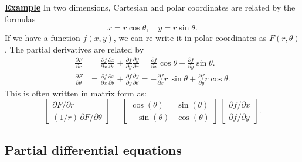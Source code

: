 \documentclass[10pt,a4paper]{article}
\begin{document}
\begin{framed}
\noindent
\underline{\textbf{Example}}
\vskip 0.1in \noindent
In two dimensions, Cartesian and polar coordinates are related by the
formulas
\begin{equation}
x = r\cos\theta, \quad y = r\sin\theta.
\end{equation}
If we have a function $f(x,y)$, we can re-write it in polar
coordinates as $F(r,\theta)$.  The partial derivatives are related by
\begin{align}
  \frac{\partial F}{\partial r} &=
  \frac{\partial f}{\partial x} \frac{\partial x}{\partial r} + \frac{\partial f}{\partial y} \frac{\partial y}{\partial r} = \frac{\partial f}{\partial x} \cos\theta + \frac{\partial f}{\partial y} \sin\theta. \\
  \frac{\partial F}{\partial \theta} &= \frac{\partial f}{\partial x} \frac{\partial x}{\partial \theta} + \frac{\partial f}{\partial y} \frac{\partial y}{\partial \theta} = -\frac{\partial f}{\partial x} r\,\sin\theta + \frac{\partial f}{\partial y} r\cos\theta.
\end{align}
This is often written in matrix form as:
\begin{equation}
  \begin{bmatrix}\partial F/\partial r \\ (1/r) \,
  \partial F/\partial \theta\end{bmatrix}
  = \begin{bmatrix}\cos(\theta) & \sin(\theta)\\ -\sin(\theta) &
    \cos(\theta) \end{bmatrix}\, \begin{bmatrix}\partial f/\partial x
    \\ \partial f/\partial y\end{bmatrix}.
\end{equation}
\end{framed}

\subsection{Partial differential equations}
\label{partial-differential-equations}
\end{document}
